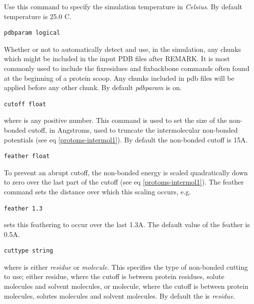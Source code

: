 \documentclass[letterpaper,10pt,english]{sphinxmanual}
\begin{document}
Use this command to specify the simulation temperature in \emph{Celsius}. By default temperature is 25.0 C.

\begin{Verbatim}[frame=single,commandchars=\\\{\}]
pdbparam logical
\end{Verbatim}

Whether or not to automatically detect and use, in the simulation, any chunks which might be included in the input PDB files after REMARK. It is most commonly used to include the fixresidues and fixbackbone commands often found at the beginning of a protein scoop. Any chunks included in pdb files will be applied before any other chunk. By default \emph{pdbparam} is on.

\begin{Verbatim}[frame=single,commandchars=\\\{\}]
cutoff float
\end{Verbatim}

where  is any positive number. This command is used to set the size of the non-bonded cutoff, in Angstroms, used to truncate the intermolecular non-bonded potentials (see eq \eqref{protoms-intermol1}). By default the non-bonded cutoff is 15A.

\begin{Verbatim}[frame=single,commandchars=\\\{\}]
feather float
\end{Verbatim}

To prevent an abrupt cutoff, the non-bonded energy is scaled quadratically down to zero over the last part of the cutoff (see eq \eqref{protoms-intermol1}). The feather command sets the distance over which this scaling occurs, e.g.

\begin{Verbatim}[frame=single,commandchars=\\\{\}]
feather 1.3
\end{Verbatim}

sets this feathering to occur over the last 1.3A. The default value of the feather is 0.5A.

\begin{Verbatim}[frame=single,commandchars=\\\{\}]
cuttype string
\end{Verbatim}

where  is either \emph{residue} or \emph{molecule}. This specifies the type of non-bonded cutting to use; either residue, where the cutoff is between protein residues, solute molecules and solvent molecules, or molecule, where the cutoff is between protein molecules, solutes molecules and solvent molecules. By default the  is \emph{residue}.
\end{document}
